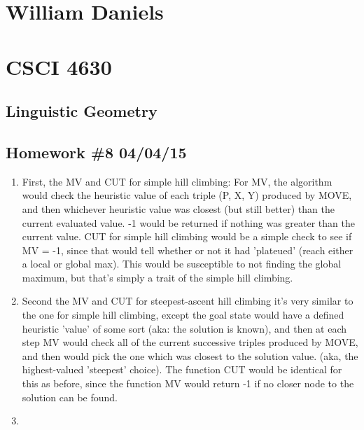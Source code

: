 \documentclass[11pt]{article}
\begin{document}
\begin{center}
\section*{William Daniels}
\section*{CSCI 4630}
\subsection*{Linguistic Geometry}
\subsection*{Homework \#8 04/04/15}
\end{center}

\vspace{.25cm}

\begin{enumerate} 
\item First, the MV and CUT for simple hill climbing: 
For MV, the algorithm would check the heuristic value of each triple (P, X, Y) produced by MOVE, and then whichever heuristic value was closest (but still better) than the current evaluated value. -1 would be returned if nothing was greater than the current value. CUT for simple hill climbing would be a simple check to see if MV = -1, since that would tell whether or not it had 'plateued' (reach either a local or global max). This would be susceptible to not finding the global maximum, but that's simply a trait of the simple hill climbing. 
\item Second the MV and CUT for steepest-ascent hill climbing it's very similar to the one for simple hill climbing, except the goal state would have a defined heuristic 'value' of some sort (aka: the solution is known), and then at each step MV would check all of the current successive triples produced by MOVE, and then would pick the one which was closest to the solution value. (aka, the highest-valued 'steepest' choice). The function CUT would be identical for this as before, since the function MV would return -1 if no closer node to the solution can be found. 

\item
\end{enumerate}
\end{document}
